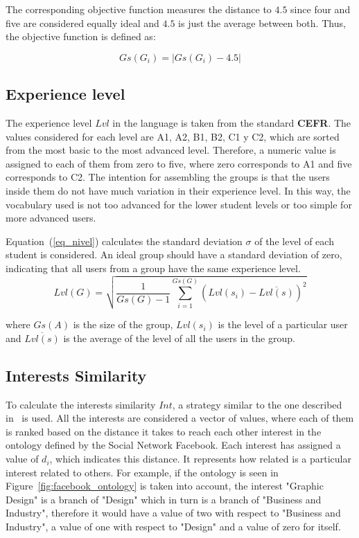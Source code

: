 The corresponding objective function measures the distance to $4.5$ since four and five are considered equally ideal and $4.5$ is just the average between both. Thus, the objective function is defined as:

\begin{equation} \label{eq_group_size}
    Gs(G_i) = | Gs(G_i) - 4.5 |
\end{equation}

\subsection{Experience level}
\label{subsection:experience_level}

The experience level $Lvl$ in the language is taken from the standard \textbf{CEFR}. The values considered for each level are A1, A2, B1, B2, C1 y C2, which are sorted from the most basic to the most advanced level. Therefore, a numeric value is assigned to each of them from zero to five, where zero corresponds to A1 and five corresponds to C2. The intention for assembling the groups is that the users inside them do not have much variation in their experience level. 
In this way, the vocabulary used is not too advanced for the lower student levels or too simple for more advanced users. 

Equation~(\ref{eq_nivel}) calculates the standard deviation $\sigma$ of the level of each student is considered. An ideal group should have a standard deviation of zero, indicating that all users from a group have the same experience level.\\

\begin{equation} \label{eq_nivel}
    Lvl(G) = \sqrt{\frac{1}{Gs(G)-1} \sum_{i=1}^{Gs(G)} (Lvl(s_i) - \overline{Lvl(s)})^2}
\end{equation}

where $Gs(A)$ is the size of the group, $Lvl(s_i)$ is the level of a particular user and $\overline{Lvl(s)}$ is the average of the level of all the users in the group.

\subsection{Interests Similarity}
\label{subsection:interests_similarity}

To calculate the interests similarity $Int$, a strategy similar to the one described in~\cite{taxonomy_semantic_similarity} is used. All the interests are considered a vector of values, where each of them is ranked based on the distance it takes to reach each other interest in the ontology defined by the Social Network Facebook. Each interest has assigned a value of $d_i$, which indicates this distance. It represents how related is a particular interest related to others. For example, if the ontology is seen in Figure~\ref{fig:facebook_ontology} is taken into account, the interest "Graphic Design" is a branch of "Design" which in turn is a branch of "Business and Industry", therefore it would have a value of two with respect to "Business and Industry", a value of one with respect to "Design" and a value of zero for itself. \\

